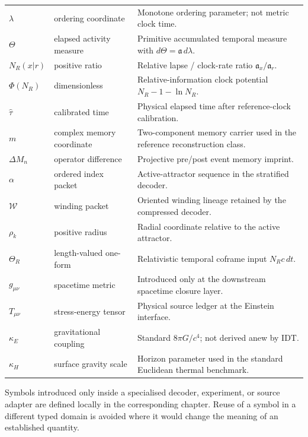 \begin{longtable}{p{}p{}p{}}
\(\lambda\) & ordering coordinate & Monotone ordering parameter; not metric clock time. \\
\(\Theta\) & elapsed activity measure & Primitive accumulated temporal measure with \(d\Theta=\mathfrak a\,d\lambda\). \\
\(N_R(x|r)\) & positive ratio & Relative lapse / clock-rate ratio \(\mathfrak a_x/\mathfrak a_r\). \\
\(\Phi(N_R)\) & dimensionless & Relative-information clock potential \(N_R-1-\ln N_R\). \\
\(\widehat\tau\) & calibrated time & Physical elapsed time after reference-clock calibration. \\
\(m\) & complex memory coordinate & Two-component memory carrier used in the reference reconstruction class. \\
\(\Delta M_n\) & operator difference & Projective pre/post event memory imprint. \\
\(\alpha\) & ordered index packet & Active-attractor sequence in the stratified decoder. \\
\(\mathcal W\) & winding packet & Oriented winding lineage retained by the compressed decoder. \\
\(\rho_k\) & positive radius & Radial coordinate relative to the active attractor. \\
\(\Theta_R\) & length-valued one-form & Relativistic temporal coframe input \(N_Rc\,dt\). \\
\(g_{\mu\nu}\) & spacetime metric & Introduced only at the downstream spacetime closure layer. \\
\(T_{\mu\nu}\) & stress-energy tensor & Physical source ledger at the Einstein interface. \\
\(\kappa_E\) & gravitational coupling & Standard \(8\pi G/c^4\); not derived anew by IDT. \\
\(\kappa_H\) & surface gravity scale & Horizon parameter used in the standard Euclidean thermal benchmark. \\
\bottomrule
\end{longtable}
\normalsize

Symbols introduced only inside a specialised decoder, experiment, or source adapter are defined locally in the corresponding chapter. Reuse of a symbol in a different typed domain is avoided where it would change the meaning of an established quantity.
